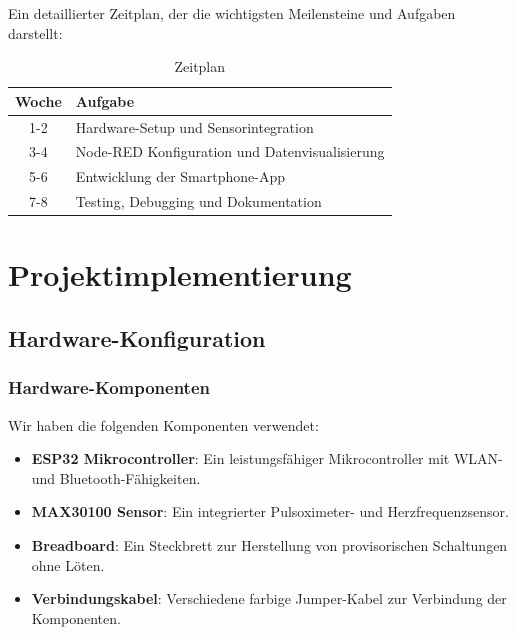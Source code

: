 \documentclass[conference,a4paper,flushend]{cs-techrep}
\begin{document}
Ein detaillierter Zeitplan, der die wichtigsten Meilensteine und Aufgaben darstellt:
\begin{table}[H]
    \centering
    \renewcommand{\arraystretch}{2} %
    \begin{tabular}{|c|l|}
        \hline
        \textbf{Woche} & \textbf{Aufgabe} \\ \hline
        1-2 & Hardware-Setup und Sensorintegration \\ \hline
        3-4 & Node-RED Konfiguration und Datenvisualisierung \\ \hline
        5-6 & Entwicklung der Smartphone-App \\ \hline
        7-8 & Testing, Debugging und Dokumentation \\ \hline
    \end{tabular}
    \vspace{0.5cm} %
    \caption{Zeitplan}
    \label{tab:zeitleiste}
\end{table}

\section{Projektimplementierung}
\subsection{Hardware-Konfiguration}
\subsubsection{Hardware-Komponenten}
Wir haben die folgenden Komponenten verwendet:
\vspace{0.5em}
\begin{itemize}
    \item \textbf{ESP32 Mikrocontroller}: Ein leistungsfähiger Mikrocontroller mit WLAN- und Bluetooth-Fähigkeiten.
    \vspace{0.5em}
    \item \textbf{MAX30100 Sensor}: Ein integrierter Pulsoximeter- und Herzfrequenzsensor.
    \vspace{0.5em}
    \item \textbf{Breadboard}: Ein Steckbrett zur Herstellung von provisorischen Schaltungen ohne Löten.
    \vspace{0.5em}
    \item \textbf{Verbindungskabel}: Verschiedene farbige Jumper-Kabel zur Verbindung der Komponenten.
    \end{itemize}
\vspace{0.8em}
\end{document}
